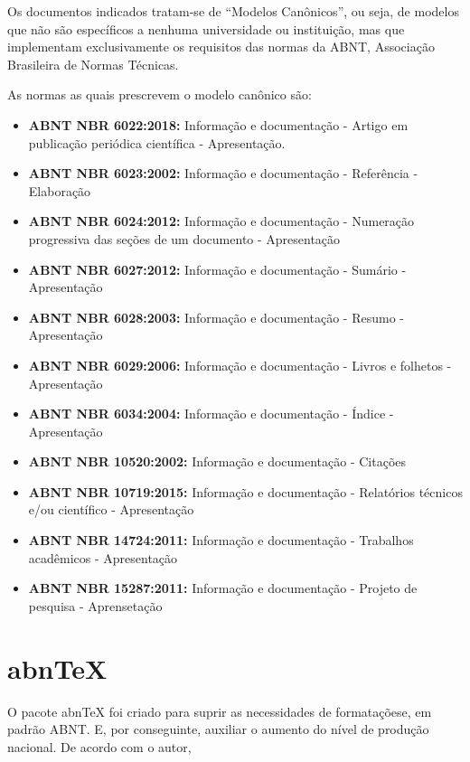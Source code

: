\documentclass[
	12pt,				%
	openright,			%
	oneside,			%
	a4paper,			%
	english,			%
	french,				%
	spanish,			%
	brazil,				%
	]{abntex2}
\begin{document}
\begin{citacao}
Os documentos indicados tratam-se de “Modelos Canônicos”, ou seja,
de modelos que não são específicos a nenhuma universidade ou instituição, mas
que implementam exclusivamente os requisitos das normas da ABNT, Associação
Brasileira de Normas Técnicas. \cite[Cap. 1]{araujoclasse}
\end{citacao}

As normas as quais prescrevem o modelo canônico são:

\begin{itemize}
  \item \textbf{ABNT NBR 6022:2018:} Informação e documentação -
    Artigo em publicação periódica científica - Apresentação.
  \item \textbf{ABNT NBR 6023:2002:} Informação e documentação -
    Referência - Elaboração
  \item \textbf{ABNT NBR 6024:2012:} Informação e documentação -
    Numeração progressiva das seções de um documento - Apresentação
  \item \textbf{ABNT NBR 6027:2012:} Informação e documentação -
    Sumário - Apresentação
  \item \textbf{ABNT NBR 6028:2003:} Informação e documentação -
    Resumo - Apresentação
    \item \textbf{ABNT NBR 6029:2006:} Informação e documentação -
      Livros e folhetos - Apresentação
    \item \textbf{ABNT NBR 6034:2004:} Informação e documentação -
      Índice - Apresentação
    \item \textbf{ABNT NBR 10520:2002:} Informação e documentação -
      Citações
    \item \textbf{ABNT NBR 10719:2015:} Informação e documentação -
      Relatórios técnicos e/ou científico - Apresentação
    \item \textbf{ABNT NBR 14724:2011:} Informação e documentação -
      Trabalhos acadêmicos - Apresentação
    \item \textbf{ABNT NBR 15287:2011:} Informação e documentação -
      Projeto de pesquisa - Aprensetação
\end{itemize}

\section{abnTeX}

O pacote abnTeX foi criado para suprir as necessidades de
formataçõese, em padrão ABNT. E, por conseguinte, auxiliar o aumento
do nível de produção nacional. De acordo com o autor,
\end{document}

